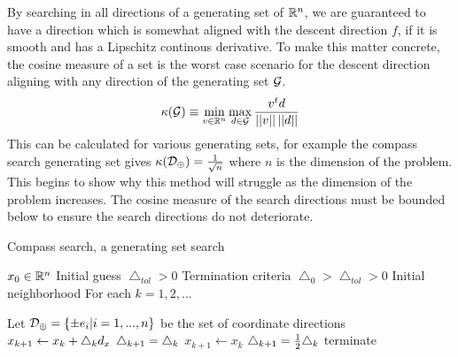 By searching in all directions of a generating set of $\mathbb{R}^{n}$, we are guaranteed to have a direction which is somewhat aligned with the descent direction $f$, if it is smooth and has a Lipschitz continous derivative.  To make this matter concrete, the cosine measure of a set is the worst case scenario for the descent direction aligning with any direction of the generating set $\mathcal{G}$.
\begin{equation}\label{kappa}
\kappa ( \mathcal{G}) \equiv \min_{v \in \mathbb{R}^{n}} \max_{d \in \mathcal{G}} \frac{v^t d}{\left| \left| {v} \right| \right| \left| \left| {d} \right| \right|}
\end{equation}
This can be calculated for various generating sets, for example the compass search generating set gives $\kappa(\mathcal{D}_\oplus) = \frac{1}{\sqrt{n}}$ where $n$ is the dimension of the problem.  This begins to show why this method will struggle as the dimension of the problem increases.  The cosine measure of the search directions must be bounded below to ensure the search directions do not deteriorate.

\begin{algorithm}
\caption{Compass search, a generating set search}\label{dfo_genset}
\begin{algorithmic}
\State $x_0 \in \mathbb{R}^{n}$ Initial guess
\State $\bigtriangleup_{tol} >0$ Termination criteria
\State $\bigtriangleup_0 > \bigtriangleup_{tol} >0$ Initial neighborhood
\BState For each $k=1,2,...$

\State Let $\mathcal{D}_\oplus =\left\{ \pm e_i| i=1,...,n\right\}$ be the set of coordinate directions
\State $x_{k+1} \gets x_k + \bigtriangleup_k d_x$
\State $\bigtriangleup_{k+1} = \bigtriangleup_k$
\Else
\State $x_{k+1} \gets x_k$
\State $\bigtriangleup_{k+1} = \frac{1}{2} \bigtriangleup_k$
 terminate \EndIf
\EndIf
\EndProcedure
\end{algorithmic}
\end{algorithm}

